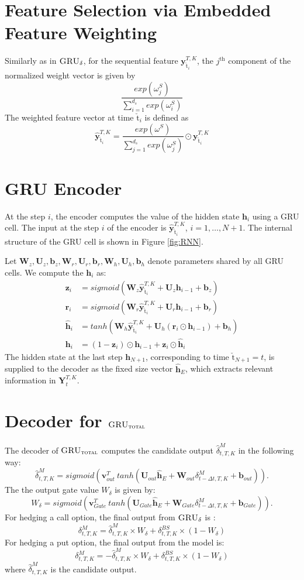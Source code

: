 \documentclass[letterpaper,12pt,titlepage,oneside,final]{book}
\numberwithin{equation}{section}
\theoremstyle{definition}
\newcommand{\model}{\textsc{GRU}_\delta}
\newcommand{\modelT}{\textsc{GRU}_{\textsc{total}}}
\newcommand{\vb}{\mathbf{b}}
\newcommand{\vy}{\mathbf{y}}
\newcommand{\DT}{\Delta t}
\newcommand{\vv}{\mathbf{v}}
\newcommand{\vh}{\mathbf{h}}
\newcommand{\vW}{\pmb{W}}
\newcommand{\vU}{\pmb{U}}
\newcommand{\nt}{\breve{\text{t}}}
\begin{document}
\section{Feature Selection via Embedded Feature Weighting}
Similarly as in $\model$, for the sequential feature $\mathbf{y}_{\nt_i}^{T,K}$,  the $j^\text{th}$ component of the normalized weight vector is given by
\[
\frac{exp(\omega^S_j)}{\sum_{i=1}^{d_s} exp(\omega^S_i)}
\]
The weighted feature vector at time  $\nt_i$ is defined as
\[
\widehat{\vy}_{\nt_i}^{T,K} =\frac{exp(\omega^S)}{\sum_{j=1}^{d_s} exp(\omega^S_j)} \odot \mathbf{y}_{\nt_i}^{T,K}
\]
\section{GRU Encoder}
At the  step $i$,  the encoder computes the value of the hidden state $\vh_{i}$ using a GRU cell. The input at the step $i$ of the encoder is $\widehat{\vy}^{T,K}_{\nt_{i}}$,  $i=1,\ldots,N+1$.
The internal structure of the GRU cell is shown in Figure \ref{fig:RNN}.

Let  $\vW_z,\vU_z,\vb_z,\vW_r,\vU_r, \vb_r,\vW_h,\vU_h,\vb_h$  denote
parameters shared by all GRU cells. We compute the $\vh_i$ as:
	\[
	\begin{split}
	\mathbf{z}_i&= sigmoid ( \vW_z \widehat{\vy}^{T,K}_{\nt_{i}} + \vU_z \vh_{i-1} +\vb_z)\\
	\mathbf{r}_i&= sigmoid ( \vW_r \widehat{\vy}^{T,K}_{\nt_{i}} + \vU_r \vh_{i-1} +\vb_r)\\
	\widehat{\vh}_i&=tanh( \vW_h \widehat{\vy}^{T,K}_{\nt_{i}}  + \vU_h (\mathbf{r}_i \odot \vh_{i-1}) +\vb_h)\\
	\vh_i&=(1-\mathbf{z}_i) \odot \vh_{i-1} + \mathbf{z}_i \odot \widehat{\vh}_i
	\end{split}
	\]
The hidden state at the last step $\vh_{N+1}$, corresponding to time ${\nt_{N+1}}={t}$, is supplied to
the decoder as the fixed size vector $\mathbf{\widehat{h}}_E$, which  extracts relevant information in $\mathbf{Y}_{t}^{T,K}$.
\section{Decoder for $\modelT$}
 The decoder of $\modelT$ computes the candidate output  $\widehat{\delta}^M_{t,T,K}$ in the following way:
\[
\widehat{\delta}^M_{t,T,K}=sigmoid (\vv^T_{out} \ tanh( \vU_{out} \mathbf{\widehat{h}}_E + \vW_{out} \delta^M_{t-\DT,T,K}+ \vb_{out})).
\]
The the output gate value $W_{\delta}$ is given by:
\[
W_{\delta}=sigmoid (\vv^T_{Gate} \ tanh( \vU_{Gate} \mathbf{\widehat{h}}_E + \vW_{Gate} \delta^M_{t-\DT,T,K}+ \vb_{Gate})).
\]
For hedging a call option, the final output from $\model$ is :
\[
\delta^M_{t,T,K}=\widehat{\delta}^M_{t,T,K} \times W_{\delta} +\delta^{BS}_{t,T,K} \times (1-W_{\delta})
\]
For hedging a put option, the final output from the model is:
\[
\delta^M_{t,T,K}=-\widehat{\delta}^M_{t,T,K} \times W_{\delta} +\delta^{BS}_{t,T,K} \times (1-W_{\delta})
\]
where $\widehat{\delta}^M_{t,T,K}$ is the candidate output.
\end{document}
